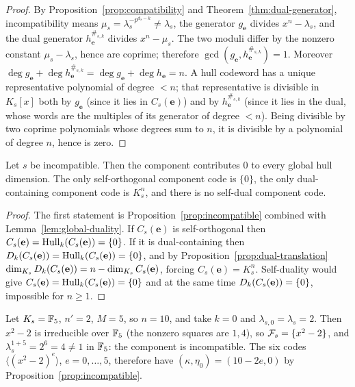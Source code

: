 \begin{proof}
By Proposition~\ref{prop:compatibility} and Theorem~\ref{thm:dual-generator},
incompatibility means $\mu_s=\lambda_s^{-p^{d_s-k}}\neq\lambda_s$, the generator
$g_{\mathbf{e}}$ divides $x^n-\lambda_s$, and the dual generator
$h_{\mathbf{e}}^{\#_{s,k}}$ divides $x^n-\mu_s$.  The two moduli differ by the
nonzero constant $\mu_s-\lambda_s$, hence are coprime; therefore
$\gcd(g_{\mathbf{e}},h_{\mathbf{e}}^{\#_{s,k}})=1$.  Moreover
$\deg g_{\mathbf{e}}+\deg h_{\mathbf{e}}^{\#_{s,k}}
 =\deg g_{\mathbf{e}}+\deg h_{\mathbf{e}}=n$.
A hull codeword has a unique representative polynomial of degree $<n$; that
representative is divisible in $K_s[x]$ both by $g_{\mathbf{e}}$ (since it lies
in $C_s(\mathbf{e})$) and by $h_{\mathbf{e}}^{\#_{s,k}}$ (since it lies in the
dual, whose words are the multiples of its generator of degree $<n$).  Being
divisible by two coprime polynomials whose degrees sum to $n$, it is divisible
by a polynomial of degree $n$, hence is zero.
\end{proof}

\begin{corollary}\label{cor:incompatible}
Let $s$ be incompatible.  Then the component contributes $0$ to every global
hull dimension.  The only self-orthogonal component code is $\{0\}$, the only
dual-containing component code is $K_s^n$, and there is no self-dual component
code.
\end{corollary}

\begin{proof}
The first statement is Proposition~\ref{prop:incompatible} combined with
Lemma~\ref{lem:global-duality}.  If $C_s(\mathbf{e})$ is self-orthogonal then
$C_s(\mathbf{e})=\operatorname{Hull}_k(C_s(\mathbf{e}))=\{0\}$.  If it is dual-containing then
$D_k(C_s(\mathbf{e}))=\operatorname{Hull}_k(C_s(\mathbf{e}))=\{0\}$, and by
Proposition~\ref{prop:dual-translation}
$\dim_{K_s}D_k(C_s(\mathbf{e}))=n-\dim_{K_s}C_s(\mathbf{e})$, forcing
$C_s(\mathbf{e})=K_s^n$.  Self-duality would give
$C_s(\mathbf{e})=\operatorname{Hull}_k(C_s(\mathbf{e}))=\{0\}$ and at the same time
$D_k(C_s(\mathbf{e}))=\{0\}$, impossible for $n\geq1$.
\end{proof}

\begin{example}\label{ex:incompatible}
Let $K_s=\mathbb F_5$, $n'=2$, $M=5$, so $n=10$, and take $k=0$ and
$\lambda_{s,0}=\lambda_s=2$.  Then $x^2-2$ is irreducible over $\mathbb F_5$ (the
nonzero squares are $1,4$), so $\mathcal F_s=\{x^2-2\}$, and
$\lambda_s^{1+5}=2^6=4\neq1$ in $\mathbb F_5$: the component is incompatible.  The six
codes $\langle(x^2-2)^e\rangle$, $e=0,\ldots,5$, therefore have
$(\kappa,\eta_0)=(10-2e,0)$ by Proposition~\ref{prop:incompatible}.
\end{example}

